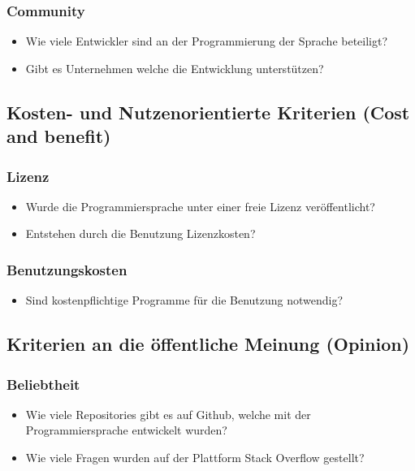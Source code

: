 \subsubsection{Community}
\begin{itemize}
	\item Wie viele Entwickler sind an der Programmierung der Sprache beteiligt?
	\item Gibt es Unternehmen welche die Entwicklung unterstützen?
\end{itemize}

\subsection{Kosten- und Nutzenorientierte Kriterien (Cost and benefit)}\label{sec:costCriteria}
\subsubsection{Lizenz}
\begin{itemize}
	\item Wurde die Programmiersprache unter einer freie Lizenz veröffentlicht?
	\item Entstehen durch die Benutzung Lizenzkosten?
\end{itemize}

\subsubsection{Benutzungskosten}
\begin{itemize}
	\item Sind kostenpflichtige Programme für die Benutzung notwendig?
\end{itemize}

\subsection{Kriterien an die öffentliche Meinung (Opinion)}\label{sec:opinionCriteria}
\subsubsection{Beliebtheit}
\begin{itemize}
	\item Wie viele Repositories gibt es auf Github, welche mit der Programmiersprache entwickelt wurden?
	\item Wie viele Fragen wurden auf der Plattform Stack Overflow gestellt?
\end{itemize}

